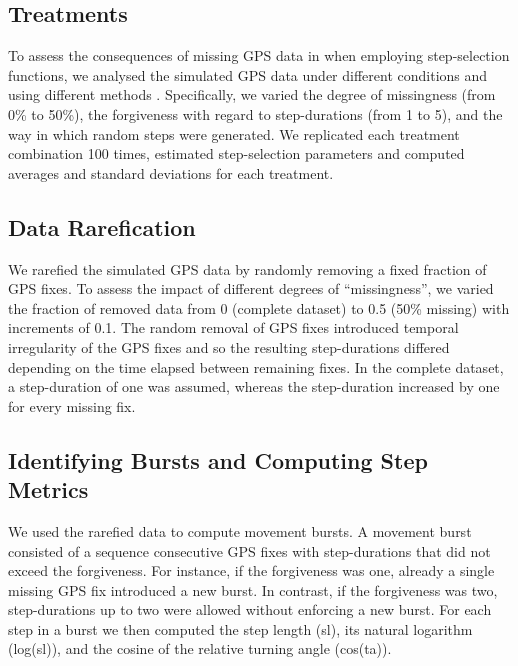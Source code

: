 \documentclass[abstract=on,10pt,a4paper,bibliography=totocnumbered]{article}
\begin{document}
\subsection{Treatments}
To assess the consequences of missing GPS data in when employing step-selection
functions, we analysed the simulated GPS data under different conditions and
using different methods . Specifically, we varied the degree of
missingness (from 0\% to 50\%), the forgiveness with regard to step-durations
(from 1 to 5), and the way in which random steps were generated. We replicated
each treatment combination 100 times, estimated step-selection parameters and
computed averages and standard deviations for each treatment.

\subsection{Data Rarefication}
We rarefied the simulated GPS data by randomly removing a fixed fraction of GPS
fixes. To assess the impact of different degrees of ``missingness'', we varied
the fraction of removed data from 0 (complete dataset) to 0.5 (50\% missing)
with increments of 0.1. The random removal of GPS fixes introduced temporal
irregularity of the GPS fixes and so the resulting step-durations differed
depending on the time elapsed between remaining fixes. In the complete dataset,
a step-duration of one was assumed, whereas the step-duration increased by one
for every missing fix.

\subsection{Identifying Bursts and Computing Step Metrics}
We used the rarefied data to compute movement bursts. A movement burst consisted
of a sequence consecutive GPS fixes with step-durations that did not exceed the
forgiveness. For instance, if the forgiveness was one, already a single missing
GPS fix introduced a new burst. In contrast, if the forgiveness was two,
step-durations up to two were allowed without enforcing a new burst. For each
step in a burst we then computed the step length (\textsf{sl}), its natural
logarithm (\textsf{log(sl)}), and the cosine of the relative turning angle
(\textsf{cos(ta)}).
\end{document}

